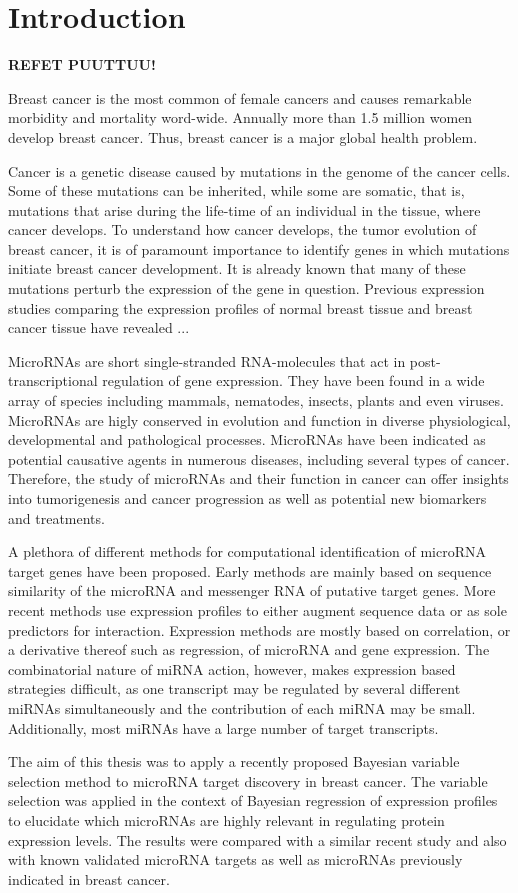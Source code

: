 
\section{Introduction}
\thispagestyle{empty}

\textbf{REFET PUUTTUU!}

Breast cancer is the most common of female cancers and causes remarkable
morbidity and mortality word-wide. Annually more than 1.5 million
women develop breast cancer. Thus, breast cancer is a major global health
problem.

Cancer is a genetic disease caused by mutations in the genome of the cancer
cells. Some of these mutations can be inherited, while some are somatic, that
is, mutations that arise during the life-time of an individual in the tissue,
where cancer develops. To understand how cancer develops, the tumor evolution
of breast cancer, it is of paramount importance to identify genes in which
mutations initiate breast cancer development. It is already known that many of
these mutations perturb the expression of the gene in question. Previous
expression studies comparing the expression profiles of normal breast tissue
and breast cancer tissue have revealed ...

MicroRNAs are short single-stranded RNA-molecules that act in
post-transcriptional regulation of gene expression. They have been found in a wide
array of species including mammals, nematodes, insects, plants and even
viruses. MicroRNAs are higly conserved in evolution and function in diverse
physiological, developmental and pathological processes. MicroRNAs have been
indicated as potential causative agents in numerous diseases, including
several types of cancer. Therefore, the study of microRNAs and their function
in cancer can offer insights into tumorigenesis and cancer progression as well
as potential new biomarkers and treatments.

A plethora of different methods for computational identification of microRNA
target genes have been proposed. Early methods are mainly based on sequence
similarity of the microRNA and messenger RNA of putative target genes. More
recent methods use expression profiles to either augment sequence data or as
sole predictors for interaction. Expression methods are mostly based on
correlation, or a derivative thereof such as regression, of microRNA and gene
expression. The combinatorial nature of miRNA action, however, makes
expression based strategies difficult, as one transcript may be regulated by
several different miRNAs simultaneously and the contribution of each miRNA may
be small. Additionally, most miRNAs have a large number of target transcripts.

The aim of this thesis was to apply a recently proposed Bayesian variable
selection method to microRNA target discovery in breast cancer. The variable
selection was applied in the context of Bayesian regression of expression
profiles to elucidate which microRNAs are highly relevant in regulating
protein expression levels. The results were compared with a similar recent
study and also with known validated microRNA targets as well as microRNAs
previously indicated in breast cancer.
